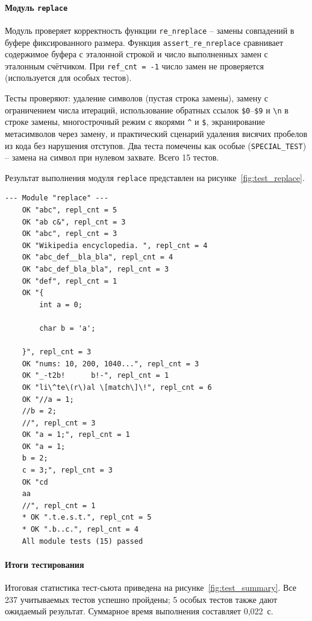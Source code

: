 \paragraph{Модуль \texttt{replace}}

Модуль проверяет корректность функции \verb`re_nreplace` -- замены совпадений в буфере фиксированного размера. Функция \verb`assert_re_nreplace` сравнивает содержимое буфера с эталонной строкой и число выполненных замен с эталонным счётчиком. При \verb`ref_cnt = -1` число замен не проверяется (используется для особых тестов).

Тесты проверяют: удаление символов (пустая строка замены), замену с ограничением числа итераций, использование обратных ссылок \verb`$0`--\verb`$9` и \verb`\n` в строке замены, многострочный режим с якорями \verb`^` и \verb`$`, экранирование метасимволов через замену, и практический сценарий удаления висячих пробелов из кода без нарушения отступов. Два теста помечены как особые (\verb`SPECIAL_TEST`) -- замена на символ при нулевом захвате. Всего 15 тестов.

Результат выполнения модуля \verb`replace` представлен на рисунке~\ref{fig:test_replace}.

\begin{lstlisting}[caption={Результат выполнения модуля replace}, label={fig:test_replace}]
	--- Module "replace" ---
	OK "abc", repl_cnt = 5
	OK "ab c&", repl_cnt = 3
	OK "abc", repl_cnt = 3
	OK "Wikipedia encyclopedia. ", repl_cnt = 4
	OK "abc_def__bla_bla", repl_cnt = 4
	OK "abc_def_bla_bla", repl_cnt = 3
	OK "def", repl_cnt = 1
	OK "{
		int a = 0;
		
		char b = 'a';
		
	}", repl_cnt = 3
	OK "nums: 10, 200, 1040...", repl_cnt = 3
	OK "_-t2b!      b!-", repl_cnt = 1
	OK "li\^te\(r\)al \[match\]\!", repl_cnt = 6
	OK "//a = 1;
	//b = 2;
	//", repl_cnt = 3
	OK "a = 1;", repl_cnt = 1
	OK "a = 1;
	b = 2;
	c = 3;", repl_cnt = 3
	OK "cd
	aa
	//", repl_cnt = 1
	* OK ".t.e.s.t.", repl_cnt = 5
	* OK ".b..c.", repl_cnt = 4
	All module tests (15) passed
\end{lstlisting}

\paragraph{Итоги тестирования}

Итоговая статистика тест-сьюта приведена на рисунке~\ref{fig:test_summary}. Все 237 учитываемых тестов успешно пройдены; 5 особых тестов также дают ожидаемый результат. Суммарное время выполнения составляет 0,022~с.


